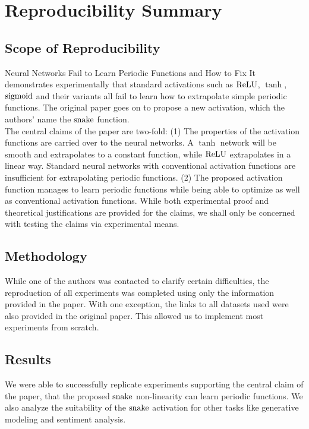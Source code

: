 \section*{\centering Reproducibility Summary}

\subsection*{Scope of Reproducibility}

Neural Networks Fail to Learn Periodic Functions and How to Fix It \cite{ziyin2020neural} demonstrates experimentally that standard activations such as \( \operatorname{ReLU} \), \( \tanh \), \( \operatorname{sigmoid} \) and their variants all fail to learn how to extrapolate simple periodic functions. The original paper goes on to propose a new activation, which the authors' name the $\operatorname{snake}$ function. \\
 
The central claims of the paper are two-fold: (1) The properties of the activation functions are carried over to the neural networks. A \( \tanh \) network will be smooth and extrapolates to a constant function, while \( \operatorname{ReLU} \) extrapolates in a linear way. Standard neural networks with conventional activation functions are insufficient for extrapolating periodic functions. (2) The proposed activation function manages to learn periodic functions while being able to optimize as well as conventional activation functions. While both experimental proof and theoretical justifications are provided for the claims, we shall only be concerned with testing the claims via experimental means.

\subsection*{Methodology}

While one of the authors was contacted to clarify certain difficulties, the reproduction of all experiments was completed using only the information provided in the paper.
With one exception, the links to all datasets used were also provided in the original paper. This allowed us to implement most experiments from scratch.

\subsection*{Results}

We were able to successfully replicate experiments supporting the central claim of the paper, that the proposed \( \operatorname{snake} \) non-linearity can learn periodic functions. We also analyze the suitability of the \( \operatorname{snake} \) activation for other tasks like generative modeling and sentiment analysis.


